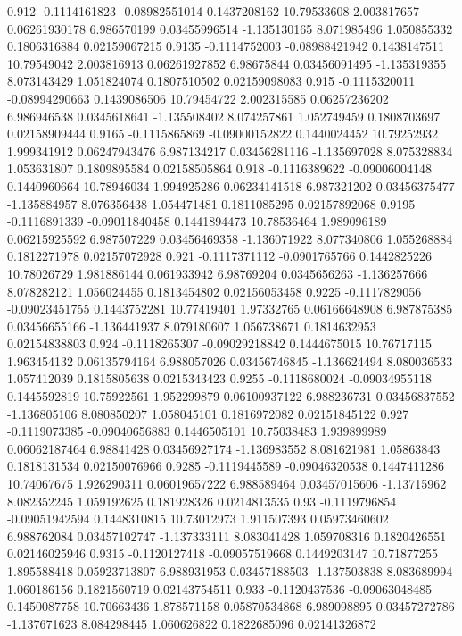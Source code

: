 {0.912 -0.1114161823 -0.08982551014 0.1437208162 10.79533608 2.003817657 0.06261930178 6.986570199 0.03455996514 -1.135130165 8.071985496 1.050855332 0.1806316884 0.02159067215
0.9135 -0.1114752003 -0.08988421942 0.1438147511 10.79549042 2.003816913 0.06261927852 6.98675844 0.03456091495 -1.135319355 8.073143429 1.051824074 0.1807510502 0.02159098083
0.915 -0.1115320011 -0.08994290663 0.1439086506 10.79454722 2.002315585 0.06257236202 6.986946538 0.0345618641 -1.135508402 8.074257861 1.052749459 0.1808703697 0.02158909444
0.9165 -0.1115865869 -0.09000152822 0.1440024452 10.79252932 1.999341912 0.06247943476 6.987134217 0.03456281116 -1.135697028 8.075328834 1.053631807 0.1809895584 0.02158505864
0.918 -0.1116389622 -0.09006004148 0.1440960664 10.78946034 1.994925286 0.06234141518 6.987321202 0.03456375477 -1.135884957 8.076356438 1.054471481 0.1811085295 0.02157892068
0.9195 -0.1116891339 -0.09011840458 0.1441894473 10.78536464 1.989096189 0.06215925592 6.987507229 0.03456469358 -1.136071922 8.077340806 1.055268884 0.1812271978 0.02157072928
0.921 -0.1117371112 -0.0901765766 0.1442825226 10.78026729 1.981886144 0.061933942 6.98769204 0.0345656263 -1.136257666 8.078282121 1.056024455 0.1813454802 0.02156053458
0.9225 -0.1117829056 -0.09023451755 0.1443752281 10.77419401 1.97332765 0.06166648908 6.987875385 0.03456655166 -1.136441937 8.079180607 1.056738671 0.1814632953 0.02154838803
0.924 -0.1118265307 -0.09029218842 0.1444675015 10.76717115 1.963454132 0.06135794164 6.988057026 0.03456746845 -1.136624494 8.080036533 1.057412039 0.1815805638 0.0215343423
0.9255 -0.1118680024 -0.09034955118 0.1445592819 10.75922561 1.952299879 0.06100937122 6.988236731 0.03456837552 -1.136805106 8.080850207 1.058045101 0.1816972082 0.02151845122
0.927 -0.1119073385 -0.09040656883 0.1446505101 10.75038483 1.939899989 0.06062187464 6.98841428 0.03456927174 -1.136983552 8.081621981 1.05863843 0.1818131534 0.02150076966
0.9285 -0.1119445589 -0.09046320538 0.1447411286 10.74067675 1.926290311 0.06019657222 6.988589464 0.03457015606 -1.13715962 8.082352245 1.059192625 0.181928326 0.0214813535
0.93 -0.1119796854 -0.09051942594 0.1448310815 10.73012973 1.911507393 0.05973460602 6.988762084 0.03457102747 -1.137333111 8.083041428 1.059708316 0.1820426551 0.02146025946
0.9315 -0.1120127418 -0.09057519668 0.1449203147 10.71877255 1.895588418 0.05923713807 6.988931953 0.03457188503 -1.137503838 8.083689994 1.060186156 0.1821560719 0.02143754511
0.933 -0.1120437536 -0.09063048485 0.1450087758 10.70663436 1.878571158 0.05870534868 6.989098895 0.03457272786 -1.137671623 8.084298445 1.060626822 0.1822685096 0.02141326872
}
